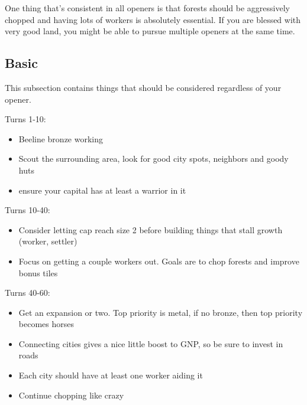 \documentclass[10pt]{article}
\begin{document}
One thing that's consistent in all openers is that forests should be aggressively chopped and
having lots of workers is absolutely essential. If you are blessed with very good land, you
might be able to pursue multiple openers at the same time.

\subsection*{Basic}

This subsection contains things that should be considered regardless of your opener.

Turns 1-10:
\begin{itemize}
\item Beeline bronze working
\item Scout the surrounding area, look for good city spots, neighbors and goody huts
\item ensure your capital has at least a warrior in it
\end{itemize}

Turns 10-40:
\begin{itemize}
\item Consider letting cap reach size 2 before building things that stall growth (worker, settler)
\item Focus on getting a couple workers out. Goals are to chop forests and improve bonus tiles
\end{itemize}

Turns 40-60:
\begin{itemize}
\item Get an expansion or two. Top priority is metal, if no bronze, then top priority becomes horses
\item Connecting cities gives a nice little boost to GNP, so be sure to invest in roads
\item Each city should have at least one worker aiding it
\item Continue chopping like crazy
\end{itemize}
\end{document}
